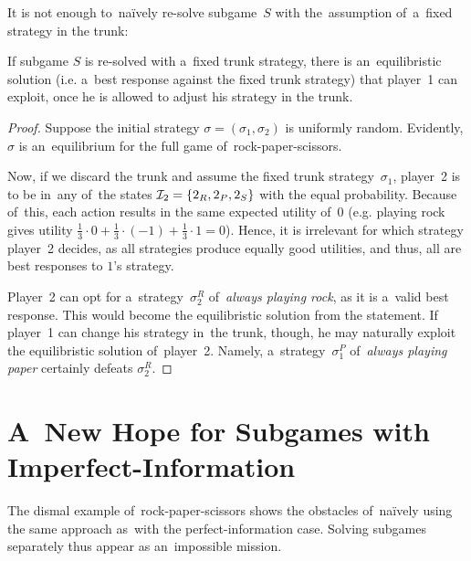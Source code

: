 It is not enough to~na{\"i}vely re-solve subgame~$S$ with the~assumption of~a~fixed strategy in the trunk:
\begin{claim}
  \label{claim:rps-subgame}
  If subgame $S$ is re-solved with a~fixed trunk strategy, there is an~equilibristic solution (i.e. a~best response against the fixed trunk strategy) that player~1 can exploit, once he is allowed to adjust his strategy in the trunk.
\end{claim}
\begin{proof}
  Suppose the initial strategy $\sigma = (\sigma_1, \sigma_2)$ is uniformly random\footnotemark{}.
  Evidently, $\sigma$ is an~equilibrium for the full game of~rock-paper-scissors.

  Now, if we discard the trunk and assume the fixed trunk strategy~$\sigma_1$, player~2 is to be in~any of~the states $\mathcal{I}_2 = \{2_R, 2_P, 2_S\}$ with the equal probability.
  Because of~this, each action results in the same expected utility of~$0$ (e.g. playing rock gives utility $\frac{1}{3} \cdot 0 + \frac{1}{3} \cdot (-1) + \frac{1}{3} \cdot 1 = 0$).
  Hence, it is irrelevant for which strategy player~2 decides, as all strategies produce equally good utilities, and thus, all are best responses to $1$'s strategy\footnotemark.

  Player~2 can opt for a~strategy~$\sigma^R_2$ of~\emph{always playing rock}, as it is a~valid best response.
  This would become the equilibristic solution from the statement.
  If player~1 can change his strategy in~the trunk, though, he may naturally exploit the equilibristic solution of~player~2.
  Namely, a~strategy~$\sigma^P_1$ of~\emph{always playing paper} certainly defeats $\sigma^R_2$.
\end{proof}

\section{A~New Hope for Subgames with Imperfect-Information}
The dismal example of~rock-paper-scissors shows the obstacles of~na{\"i}vely using the same approach as~with the perfect-information case.
Solving subgames separately thus appear as an~impossible mission. 

